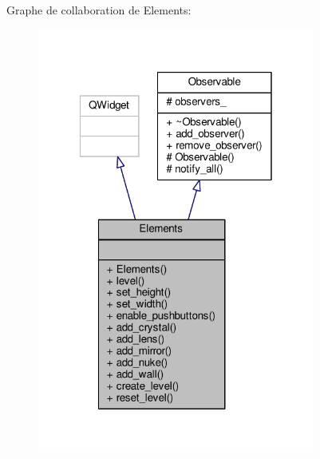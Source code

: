 Graphe de collaboration de Elements\+:\nopagebreak
\begin{figure}[H]
\begin{center}
\leavevmode
\includegraphics[width=259pt]{d3/d60/classElements__coll__graph}
\end{center}
\end{figure}
